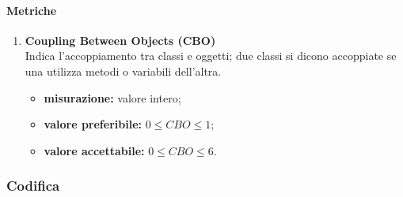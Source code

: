 		\paragraph{Metriche}
		\begin{enumerate}
		\item []
			\textbf{Coupling Between Objects (CBO)}\\
			Indica l'accoppiamento tra classi e oggetti; due classi si dicono accoppiate se una utilizza metodi o variabili dell'altra.
			\begin{itemize}
				\item \textbf{misurazione:} valore intero;
				\item \textbf{valore preferibile:} $0\leq CBO\leq 1$;
				\item \textbf{valore accettabile:} $0\leq CBO\leq 6$.
			\end{itemize}
		\end{enumerate}
	\subsubsection{Codifica}
